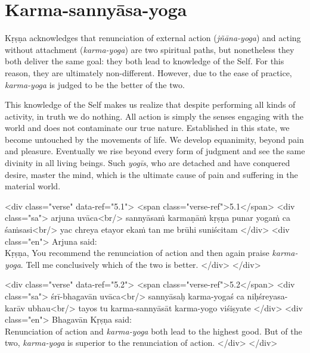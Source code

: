\chapter{Karma-sannyāsa-yoga}\label{chap-karma-sannyasa-yoga}


\noindent Kṛṣṇa acknowledges that renunciation of external action (\textit{jñāna-yoga}) and acting without attachment (\textit{karma-yoga}) are two spiritual paths, but nonetheless they both deliver the same goal: they both lead to knowledge of the Self. For this reason, they are ultimately non-different. However, due to the ease of practice, \textit{karma-yoga} is judged to be the better of the two.

This knowledge of the Self makes us realize that despite performing all kinds of activity, in truth we do nothing. All action is simply the senses engaging with the world and does not contaminate our true nature. Established in this state, we become untouched by the movements of life. We develop equanimity, beyond pain and pleasure. Eventually we rise beyond every form of judgment and see the same divinity in all living beings. Such \textit{yogīs}, who are detached and have conquered desire, master the mind, which is the ultimate cause of pain and suffering in the material world.


\begin{html}
<div class="verse" data-ref="5.1">
  <span class="verse-ref">5.1</span>
  <div class="sa">
    arjuna uvāca<br/>
    sannyāsaṁ karmaṇāṁ kṛṣṇa punar yogaṁ ca śaṁsasi<br/>
    yac chreya etayor ekaṁ tan me brūhi suniścitam
  </div>
  <div class="en">
    \hspace*{1em}Arjuna said: \\ Kṛṣṇa, You recommend the renunciation of action and then again praise \textit{karma-yoga}. Tell me conclusively which of the two is better.
  </div>
</div>
\end{html}



\begin{html}
<div class="verse" data-ref="5.2">
  <span class="verse-ref">5.2</span>
  <div class="sa">
    śrī-bhagavān uvāca<br/>
    sannyāsaḥ karma-yogaś ca niḥśreyasa-karāv ubhau<br/>
    tayos tu karma-sannyāsāt karma-yogo viśiṣyate
  </div>
  <div class="en">
    \hspace*{1em}Bhagavān Kṛṣṇa said: \\ Renunciation of action and \textit{karma-yoga} both lead to the highest good. But of the two, \textit{karma-yoga} is superior to the renunciation of action.
  </div>
</div>
\end{html}



